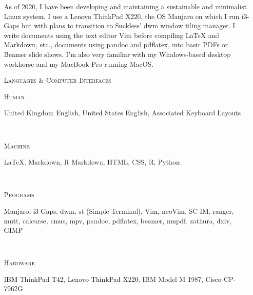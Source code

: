 \documentclass[a4, 10pt]{article}
\begin{document}
{As of 2020, I have been developing and maintaining a sustainable and minimalist Linux system. I use a Lenovo ThinkPad X220, the OS Manjaro on which I run i3-Gaps but with plans to transition to Suckless' dwm window tiling manager. I write documents using the text editor Vim before compiling {\LaTeX} and Markdown, etc., documents using pandoc and pdflatex, into basic PDFs or Beamer slide shows. I'm also very familiar with my Windows-based desktop workhorse and my MacBook Pro running MacOS.\

\begin{center}
	\textsc{Languages \& Computer Interfaces}
\end{center}

\begin{minipage}[t]{.15\linewidth}
        \hfill                  
        \textsc{Human}
\end{minipage}
\hfill\vline\hfill
\begin{minipage}[t]{.80\linewidth}
	United Kingdom English, United States English, Associated Keyboard Layouts
\end{minipage}\\

\begin{minipage}[t]{.15\linewidth}
        \hfill                  
        \textsc{Machine}
\end{minipage}
\hfill\vline\hfill
\begin{minipage}[t]{.80\linewidth}
	{\LaTeX}, Markdown, R Markdown, HTML, CSS, R, Python
\end{minipage}\\

\begin{minipage}[t]{.15\linewidth}
        \hfill                  
        \textsc{Programs}    
\end{minipage}
\hfill\vline\hfill
\begin{minipage}[t]{.80\linewidth}
	Manjaro, i3-Gaps, dwm, st (Simple Terminal), Vim, neoVim, SC-IM, ranger, mutt, calcurse, cmus, mpv, pandoc, pdflatex, beamer, mupdf, zathura, dxiv, GIMP 
\end{minipage}\\

\begin{minipage}[t]{.15\linewidth}
        \hfill                  
        \textsc{Hardware}    
\end{minipage}
\hfill\vline\hfill
\begin{minipage}[t]{.80\linewidth}
	IBM ThinkPad T42, Lenovo ThinkPad X220, IBM Model M 1987, Cisco CP-7962G
\end{minipage}\\


}
\end{document}
